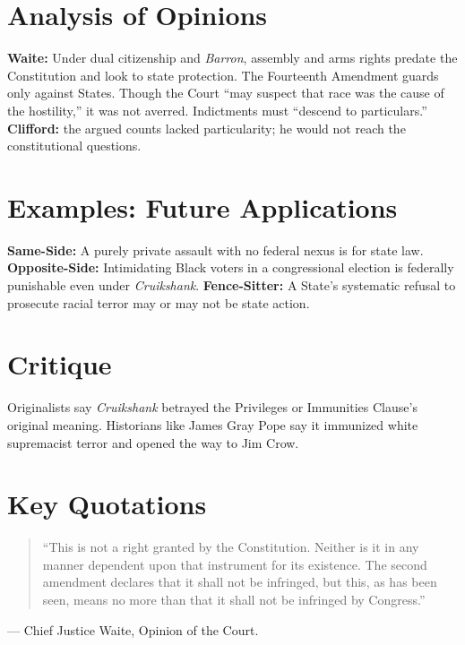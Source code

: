 \documentclass[12pt]{article}
\begin{document}
\section{Analysis of Opinions}
\textbf{Waite:} Under dual citizenship and \textit{Barron}, assembly and arms rights predate the Constitution and look to state protection. The Fourteenth Amendment guards only against States. Though the Court ``may suspect that race was the cause of the hostility,'' it was not averred. Indictments must ``descend to particulars.'' \textbf{Clifford:} the argued counts lacked particularity; he would not reach the constitutional questions.

\section{Examples: Future Applications}
\textbf{Same-Side:} A purely private assault with no federal nexus is for state law. \textbf{Opposite-Side:} Intimidating Black voters in a congressional election is federally punishable even under \textit{Cruikshank}. \textbf{Fence-Sitter:} A State's systematic refusal to prosecute racial terror may or may not be state action.

\section{Critique}
Originalists say \textit{Cruikshank} betrayed the Privileges or Immunities Clause's original meaning. Historians like James Gray Pope say it immunized white supremacist terror and opened the way to Jim Crow.

\section{Key Quotations}
\begin{quote}
``This is not a right granted by the Constitution. Neither is it in any manner dependent upon that instrument for its existence. The second amendment declares that it shall not be infringed, but this, as has been seen, means no more than that it shall not be infringed by Congress.''
\end{quote}
\noindent --- Chief Justice Waite, Opinion of the Court.
\end{document}

